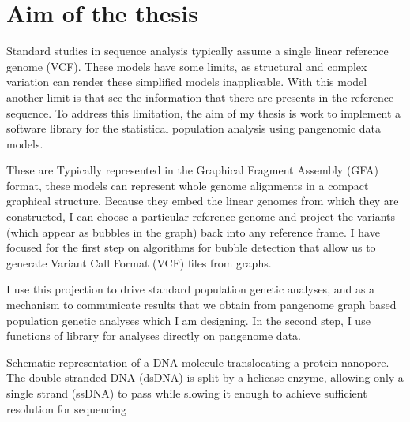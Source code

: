 
\chapter{Aim of the thesis} %

\label{Chapter4} %




Standard studies in sequence analysis typically assume a single linear reference genome (VCF). 
These models have some limits, as structural and complex variation can render these simplified models inapplicable. With this model another limit is that see the information that there are presents in the reference sequence. To address this limitation, the aim of my thesis is work to implement a software library for the statistical population analysis using pangenomic data models.

\noindent
These are Typically represented in the Graphical Fragment Assembly (GFA) format, these models can represent whole genome alignments in a compact graphical structure. Because they embed the linear genomes from which they are constructed, I can choose a particular reference genome and project the variants (which appear as bubbles in the graph) back into any reference frame. I have focused for the first step on algorithms for bubble detection that allow us to generate Variant Call Format (VCF) files from graphs.

I use this projection to drive standard population genetic analyses, and as a mechanism to communicate results that we obtain from pangenome graph based population genetic analyses which I am designing.
In the second step, I use functions of library for analyses directly on pangenome data.


Schematic representation of a DNA molecule translocating a protein nanopore. The double-stranded DNA (dsDNA) is split by a helicase enzyme, allowing only a single strand (ssDNA) to pass while slowing it enough to achieve sufficient resolution for sequencing